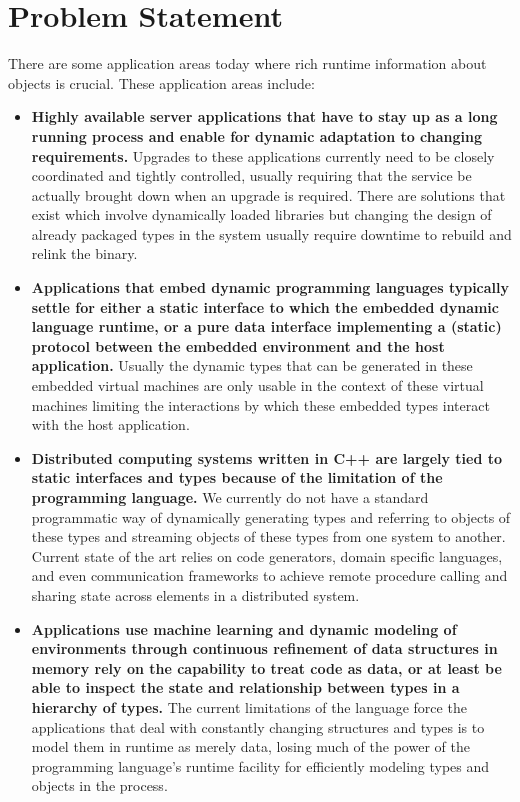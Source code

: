 \section{Problem Statement}

There are some application areas today where rich runtime information about
objects is crucial.  These application areas include:

\begin{itemize}
\item \textbf{Highly available server applications that have to stay up as a
long running process and enable for dynamic adaptation to changing
requirements.} Upgrades to these applications currently need to be closely
coordinated and tightly controlled, usually requiring that the service be
actually brought down when an upgrade is required. There are solutions that
exist which involve dynamically loaded libraries but changing the design of
already packaged types in the system usually require downtime to rebuild and
relink the binary.

\item \textbf{Applications that embed dynamic programming languages typically
settle for either a static interface to which the embedded dynamic language
runtime, or a pure data interface implementing a (static) protocol between the
embedded environment and the host application.} Usually the dynamic types that
can be generated in these embedded virtual machines are only usable in the
context of these virtual machines limiting the interactions by which these
embedded types interact with the host application.

\item \textbf{Distributed computing systems written in C++ are largely tied to
static interfaces and types because of the limitation of the programming
language.} We currently do not have a standard programmatic way of dynamically
generating types and referring to objects of these types and streaming objects
of these types from one system to another. Current state of the art relies on
code generators, domain specific languages, and even communication frameworks to
achieve remote procedure calling and sharing state across elements in a
distributed system.

\item \textbf{Applications use machine learning and dynamic modeling of
environments through continuous refinement of data structures in memory rely on
the capability to treat code as data, or at least be able to inspect the state
and relationship between types in a hierarchy of types.} The current limitations
of the language force the applications that deal with constantly changing
structures and types is to model them in runtime as merely data, losing much of
the power of the programming language’s runtime facility for efficiently
modeling types and objects in the process.


\end{itemize}
